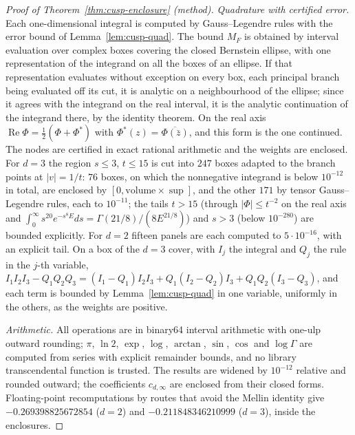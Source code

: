 \begin{proof}[Proof of Theorem~\ref{thm:cusp-enclosure} (method)]
\emph{Quadrature with certified error.} Each one-dimensional integral is computed by Gauss--Legendre rules with the error bound of Lemma~\ref{lem:cusp-quad}. The bound $M_F$ is obtained by interval evaluation over complex boxes covering the closed Bernstein ellipse, with one representation of the integrand on all the boxes of an ellipse. If that representation evaluates without exception on every box, each principal branch being evaluated off its cut, it is analytic on a neighbourhood of the ellipse; since it agrees with the integrand on the real interval, it is the analytic continuation of the integrand there, by the identity theorem. On the real axis $\operatorname{Re}\Phi=\frac12(\Phi+\Phi^*)$ with $\Phi^*(z)=\overline{\Phi(\bar z)}$, and this form is the one continued. The nodes are certified in exact rational arithmetic and the weights are enclosed. For $d=3$ the region $s\le3$, $t\le15$ is cut into $247$ boxes adapted to the branch points at $|v|=1/t$: $76$ boxes, on which the nonnegative integrand is below $10^{-12}$ in total, are enclosed by $[0,\text{volume}\times\sup]$, and the other $171$ by tensor Gauss--Legendre rules, each to $10^{-11}$; the tails $t>15$ (through $|\Phi|\le t^{-2}$ on the real axis and $\int_0^\infty s^{20}e^{-s^8E}ds=\Gamma(21/8)/(8E^{21/8})$) and $s>3$ (below $10^{-280}$) are bounded explicitly. For $d=2$ fifteen panels are each computed to $5\cdot10^{-16}$, with an explicit tail. On a box of the $d=3$ cover, with $I_j$ the integral and $Q_j$ the rule in the $j$-th variable, $I_1I_2I_3-Q_1Q_2Q_3=(I_1-Q_1)I_2I_3+Q_1(I_2-Q_2)I_3+Q_1Q_2(I_3-Q_3)$, and each term is bounded by Lemma~\ref{lem:cusp-quad} in one variable, uniformly in the others, as the weights are positive.

\emph{Arithmetic.} All operations are in binary64 interval arithmetic with one-ulp outward rounding; $\pi$, $\ln2$, $\exp$, $\log$, $\arctan$, $\sin$, $\cos$ and $\log\Gamma$ are computed from series with explicit remainder bounds, and no library transcendental function is trusted. The results are widened by $10^{-12}$ relative and rounded outward; the coefficients $c_{d,\infty}$ are enclosed from their closed forms. Floating-point recomputations by routes that avoid the Mellin identity give $-0.269398825672854$ ($d=2$) and $-0.211848346210999$ ($d=3$), inside the enclosures.
\end{proof}

